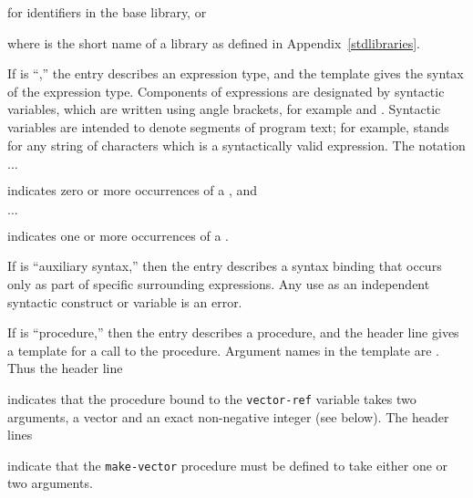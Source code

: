 for identifiers in the base library, or

\noindent{}\unpenalty

where  is the short name of a library
as defined in Appendix~\ref{stdlibraries}.

If  is ``\exprtype,'' the entry describes an expression
type, and the template gives the syntax of the expression type.
Components of expressions are designated by syntactic variables, which
are written using angle brackets, for example  and
.  Syntactic variables are intended to denote segments of
program text; for example,  stands for any string of
characters which is a syntactically valid expression.  The notation
\begin{tabbing}
\qquad {} $\ldots$
\end{tabbing}
indicates zero or more occurrences of a , and
\begin{tabbing}
\qquad {}  $\ldots$
\end{tabbing}
indicates one or more occurrences of a .

If  is ``auxiliary syntax,'' then the entry describes a
syntax binding that occurs only as part of specific surrounding
expressions. Any use as an independent syntactic construct or
variable is an error.

If  is ``procedure,'' then the entry describes a procedure, and
the header line gives a template for a call to the procedure.  Argument
names in the template are .  Thus the header line

\noindent{}\unpenalty

indicates that the procedure bound to the {\tt vector-ref} variable takes
two arguments, a vector  and an exact non-negative integer
 (see below).  The header lines

\noindent%
\unpenalty

indicate that the {\tt make-vector} procedure must be defined to take
either one or two arguments.

